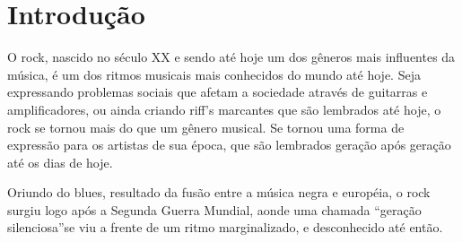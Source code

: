 \chapter{Introdução}

\setcounter{page}{1}

O rock, nascido no século XX e sendo até hoje um dos gêneros mais influentes da música, é um dos 
ritmos musicais mais conhecidos do mundo até hoje. Seja expressando problemas sociais que afetam a 
sociedade através de guitarras e amplificadores, ou ainda criando riff's marcantes que são 
lembrados até hoje, o rock se tornou mais do que um gênero musical. Se tornou uma forma de 
expressão para os artistas de sua época, que são lembrados geração após geração até os dias de hoje.

Oriundo do blues, resultado da fusão entre a música negra e européia, o rock surgiu logo após a 
Segunda Guerra Mundial, aonde uma chamada ``geração silenciosa''se viu a frente de um ritmo 
marginalizado, e desconhecido até então.
 

